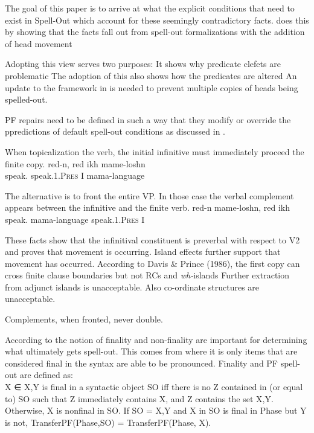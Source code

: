 \documentclass[12pt, letterpaper]{article}
\begin{document}
\ex The goal of this paper is to arrive at what the explicit conditions that need to exist in Spell-Out which account for these seemingly contradictory facts.
	\ea \citeauthor{bleamanPredicateFrontingYiddish2021} does this by showing that the facts fall out from \citet{collinsFormalizationMinimalistSyntax2016} spell-out formalizations with the addition of head movement

	\ex Adopting this view serves two purposes:
		\ea It shows why predicate clefets are problematic
		\ex The adoption of this also shows how the predicates are altered 
		\z 
	\ex An update to the framework in \citet{collinsFormalizationMinimalistSyntax2016} is needed to prevent multiple copies of heads being spelled-out. 
	\z 

\ex PF repairs need to be defined in such a way that they modify or override the ppredictions of default spell-out conditions as discussed in \citet{chomskyMinimalistProgram1995}. 

\ex When topicalization the verb, the initial infinitive must immediately proceed the finite copy. 
	\ea 
	\gll red-n, red ikh mame-loshn\\
	speak.\Inf{} speak.\textsc{1}.\textsc{Pres} I mama-language\\
	\z 

\ex The alternative is to front the entire VP. In those case the verbal complement appears between the infinitive and the finite verb. 
	\ea 
	\gll red-n mame-loshn, red ikh \\
	speak.\Inf{} mama-language speak.\textsc{1}.\textsc{Pres} I\\
	\z 

\ex These facts show that the infinitival constituent is preverbal with respect to V2 and proves that movement is occurring. 
	\ea Island effects further support that movement has occurred.
		\ea According to Davis \& Prince (1986), the first copy can cross finite clause boundaries but not RCs and \emph{wh-}islands
		\ex Further extraction from adjunct islands is unacceptable.
		\ex Also co-ordinate structures are unacceptable. 
		\z   
	\z 

\ex Complements, when fronted, never double. 

\ex According to \citeauthor{bleamanPredicateFrontingYiddish2021} the notion of finality and non-finality are important for determining what ultimately gets spell-out. 
	\ea This comes from \citet{collinsFormalizationMinimalistSyntax2016} where it is only items that are considered final in the syntax are able to be pronounced. 
	\ex Finality and PF spell-out are defined as:\\
		\ea X ∈ {X,Y} is final in a syntactic object SO iff there is no Z contained in (or equal to) SO such that Z immediately contains X, and Z contains the set {X,Y}. Otherwise, X is nonfinal in SO. 
		\ex If SO = {X,Y} and X in SO is final in Phase but Y is not, TransferPF(Phase,SO) = TransferPF(Phase, X). 
		\z 
	\z 
\end{document}
